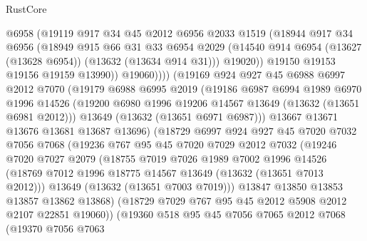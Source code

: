 \begin{lexlean}{RustCore}
\begin{coremodule}
                  @6958
                  (@19119
                    @917
                    @34
                    @45
                    @2012
                    @6956
                    @2033
                    @1519
                    (@18944
                      @917
                      @34
                      @6956
                      (@18949
                        @915
                        @66
                        @31
                        @33
                        @6954
                        @2029
                        (@14540 @914 @6954 (@13627 (@13628 @6954)) (@13632 (@13634 @914 @31)))
                        @19020))
                    @19150
                    @19153
                    @19156
                    @19159
                    @13990))
                @19060))))
        (@19169
          @924
          @927
          @45
          @6988
          @6997
          @2012
          @7070
          (@19179
            @6988
            @6995
            @2019
            (@19186
              @6987
              @6994
              @1989
              @6970
              @1996
              @14526
              (@19200 @6980 @1996 @19206 @14567 @13649 (@13632 (@13651 @6981 @2012)))
              @13649
              (@13632 (@13651 @6971 @6987)))
            @13667
            @13671
            @13676
            @13681
            @13687
            @13696)
          (@18729
            @6997
            @924
            @927
            @45
            @7020
            @7032
            @7056
            @7068
            (@19236
              @767
              @95
              @45
              @7020
              @7029
              @2012
              @7032
              (@19246
                @7020
                @7027
                @2079
                (@18755
                  @7019
                  @7026
                  @1989
                  @7002
                  @1996
                  @14526
                  (@18769 @7012 @1996 @18775 @14567 @13649 (@13632 (@13651 @7013 @2012)))
                  @13649
                  (@13632 (@13651 @7003 @7019)))
                @13847
                @13850
                @13853
                @13857
                @13862
                @13868)
              (@18729 @7029 @767 @95 @45 @2012 @5908 @2012 @2107 @22851 @19060))
            (@19360
              @518
              @95
              @45
              @7056
              @7065
              @2012
              @7068
              (@19370
                @7056
                @7063

\end{coremodule}
\end{lexlean}
